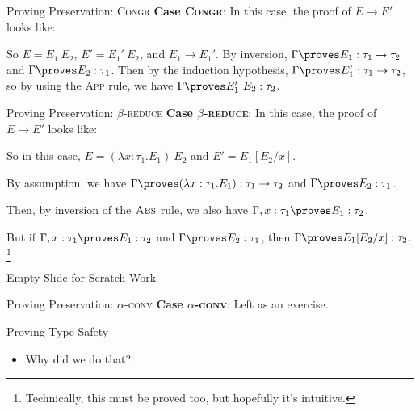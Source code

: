 \documentclass[leqno,presentation,usenames,dvipsnames]{beamer}
\begin{document}
\begin{frame}{Proving Preservation: \textsc{Congr}}
    \textbf{Case \textsc{Congr}}: In this case, the proof of $E \to E'$ looks like:
    \begin{mathpar}
    \end{mathpar}

    So $E = E_1~E_2$, $E' = E_1'~E_2$, and $E_1 \to E_1'$.
    By inversion, $\Gamma \proves E_1 : \tau_1 \to \tau_2$ and $\Gamma \proves E_2 : \tau_1$.
    Then by the induction hypothesis, $\Gamma \proves E_1' : \tau_1 \to \tau_2$, so by using the \textsc{App} rule, we have $\Gamma \proves E_1'~E_2 : \tau_2$.
\end{frame}

\begin{frame}{Proving Preservation: \textsc{$\beta$-reduce}}
    \textbf{Case \textsc{$\beta$-reduce}}: In this case, the proof of $E \to E'$ looks like:
    \begin{mathpar}
    \end{mathpar}

    So in this case, $E = (\lambda x : \tau_1. E_1)~E_2$ and $E' = E_1[E_2/x]$.

    By assumption, we have $\Gamma \proves (\lambda x : \tau_1. E_1) : \tau_1 \to \tau_2$ and $\Gamma \proves E_2 : \tau_1$.

    Then, by inversion of the $\textsc{Abs}$ rule, we also have $\Gamma, x : \tau_1 \proves E_1 : \tau_2$.

    But if $\Gamma, x : \tau_1 \proves E_1 : \tau_2$ and $\Gamma \proves E_2 : \tau_1$, then $\Gamma \proves E_1[E_2/x] : \tau_2$. \footnote{Technically, this must be proved too, but hopefully it's intuitive.}
\end{frame}

\begin{frame}{Empty Slide for Scratch Work}
\end{frame}

\begin{frame}{Proving Preservation: \textsc{$\alpha$-conv}}
    \textbf{Case \textsc{$\alpha$-conv}}: Left as an exercise.
\end{frame}

\begin{frame}{Proving Type Safety}
    \begin{itemize}
        \item Why did we do that?
    \end{itemize}
\end{frame}
\end{document}
